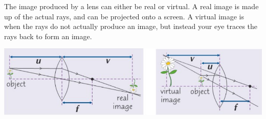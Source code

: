 \documentclass[a4paper, 12pt]{article}
\begin{document}
The image produced by a lens can either be real or virtual. A real image is made up of the actual rays, and can be projected onto a screen. A virtual image is when the rays do not actually produce an image, but instead your eye traces the rays back to form an image.

\begin{center}
\includegraphics[width=\textwidth]{images/realAndImaginaryImages.png}
\end{center}
\end{document}
